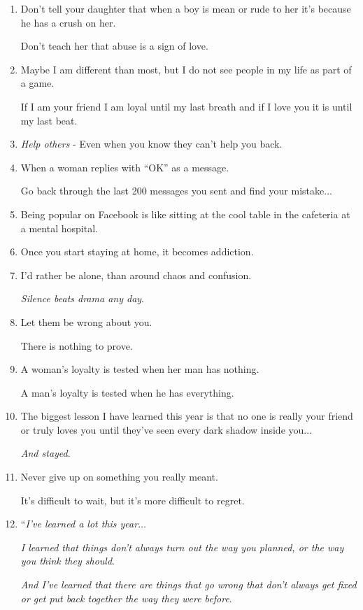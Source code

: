\documentclass{article}
\numberwithin{equation}{section}
\begin{document}
\begin{enumerate}
    They're the ones who \textit{deserve special places in your heart}.
    \item Don't tell your daughter that when a boy is mean or rude to her it's because he has a crush on her.
    
    Don't teach her that abuse is a sign of love.
    \item Maybe I am different than most, but I do not see people in my life as part of a game.
    
    If I am your friend I am loyal until my last breath and if I love you it is until my last beat.
    \item \textit{Help others} - Even when you know they can't help you back.
    \item When a woman replies with ``OK'' as a message.
    
    Go back through the last 200 messages you sent and find your mistake$\ldots$
    \item Being popular on Facebook is like sitting at the cool table in the cafeteria at a mental hospital.
    \item Once you start staying at home, it becomes addiction.
    \item I'd rather be alone, than around chaos and confusion.
    
    \textit{Silence beats drama any day}.
    \item Let them be wrong about you.
    
    There is nothing to prove.
    \item A woman's loyalty is tested when her man has nothing.
    
    A man's loyalty is tested when he has everything.
    \item The biggest lesson I have learned this year is that no one is really your friend or truly loves you until they've seen every dark shadow inside you$\ldots$
    
    \textit{And stayed}.
    \item Never give up on something you really meant.
    
    It's difficult to wait, but it's more difficult to regret.
    \item ``\textit{I've learned a lot this year}$\ldots$
    
    \textit{I learned that things don't always turn out the way you planned, or the way you think they should}.
    
    \textit{And I've learned that there are things that go wrong that don't always get fixed or get put back together the way they were before}.
    

\end{enumerate}
\end{document}
